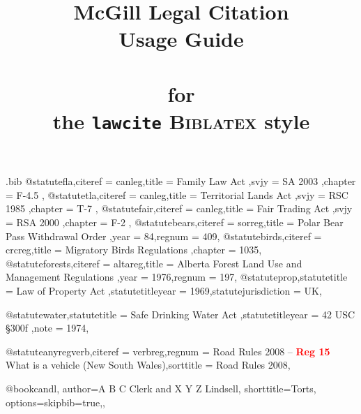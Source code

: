 \begin{filecontents*}[overwrite]{\jobname.bib}
@statute{fla,citeref = {canleg},title = {Family Law Act },svjy = {SA 2003 },chapter = {F-4.5 },}
@statute{tla,citeref = {canleg},title = {Territorial Lands Act },svjy = {RSC 1985 },chapter = {T-7 },}
@statute{fair,citeref = {canleg},title = {Fair Trading Act },svjy = {RSA 2000 },chapter = {F-2 },}
@statute{bears,citeref = {sorreg},title = {Polar Bear Pass Withdrawal Order },year = {84},regnum = {409},}
@statute{birds,citeref = {crcreg},title = {Migratory Birds Regulations },chapter = {1035},}
@statute{forests,citeref = {altareg},title = {Alberta Forest Land Use and Management Regulations },year = {1976},regnum = {197},}
@statute{prop,statutetitle = {Law of Property Act },statutetitleyear = {1969},statutejurisdiction = {UK},}

@statute{water,statutetitle = {Safe Drinking Water Act },statutetitleyear = {42 USC §300f },note = {1974},}

@statute{anyregverb,citeref = {verbreg},regnum = {Road Rules 2008 -- \textcolor{red}{\textbf{Reg 15}} What is a vehicle (New South Wales)},sorttitle = {Road Rules 2008},}

@book{candl,
author={A B C Clerk and X Y Z Lindsell},
shorttitle={Torts},
options={skipbib=true,},
}

\end{filecontents*}




\documentclass[12pt]{article}
\newcommand\rulesep{\rule{0.4\textwidth}{.4pt}}

\title{McGill Legal Citation\\Usage Guide\\ \ \\{\normalsize for \\ the \texttt{lawcite} \textsc{Biblatex} style}}
\author{}
\date{}
\long\gdef{}
\usepackage[table]{xcolor}
\pagecolor{blue!3}
\usepackage{fontspec}
\setmainfont{Noto Serif}
\setsansfont{TeX Gyre Schola}[Scale=1.2]%
\setmonofont{Noto Sans Mono}%
\usepackage[british]{babel}
\usepackage{csquotes}
\usepackage{graphicx}

\usepackage{marginnote}
\usepackage{abstract}
\usepackage{microtype}

\newcommand\note[1]{(\texttt{#1})}


